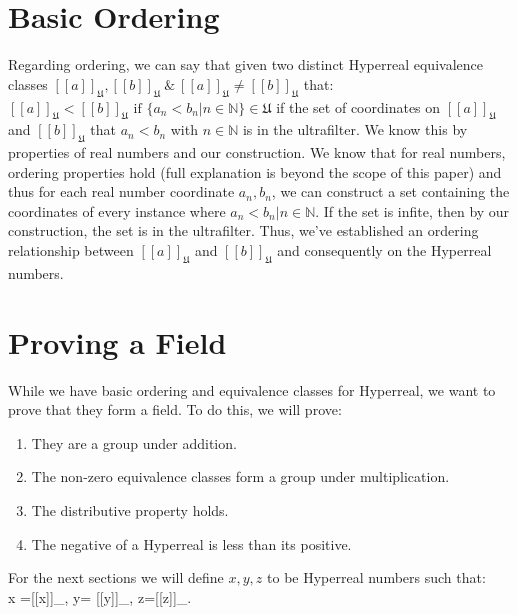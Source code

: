 \documentclass[12pt]{report}
\newcommand{\N}{\mathbb{N}}
\newcommand{\U}{\mathfrak{U}}
\begin{document}
\section*{Basic Ordering}
Regarding ordering, we can say that given two distinct Hyperreal equivalence classes $  [[a]]_{\U}, [[b]]_{\U} \ \& \ [[a]]_{\U}\not= [[b]]_{\U} $ that: $ [[a]]_{\U}< [[b]]_{\U} \text{ if }\{a_n < b_n | n \in \N \} \in \U $ if the set of coordinates on $[[a]]_{\U}$ and $[[b]]_{\U}$ that $a_n < b_n$ with $n \in \N $ is in the ultrafilter.
We know this by properties of real numbers and our construction.
We know that for real numbers, ordering properties hold (full explanation is beyond the scope of this paper) and thus for each real number coordinate $a_n, b_n$, we can construct a set containing the coordinates of every instance where $a_n < b_n | n \in \N$.
If the set is infite, then by our construction, the set is in the ultrafilter.
Thus, we've established an ordering relationship between $[[a]]_{\U}$ and $[[b]]_{\U}$ and consequently on the Hyperreal numbers.

\section*{Proving a Field}
While we have basic ordering and equivalence classes for Hyperreal, we want to prove that they form a field.
To do this, we will prove:
\begin{enumerate}
    \item They are a group under addition.
    \item The non-zero equivalence classes form a group under multiplication.
    \item The distributive property holds.
    \item The negative of a Hyperreal is less than its positive.
\end{enumerate}
For the next sections we will define $x,y,z$ to be Hyperreal numbers such that:\\ x =[[x]]_{\U}, y= [[y]]_{\U}, z=[[z]]_{\U}.
\end{document}
